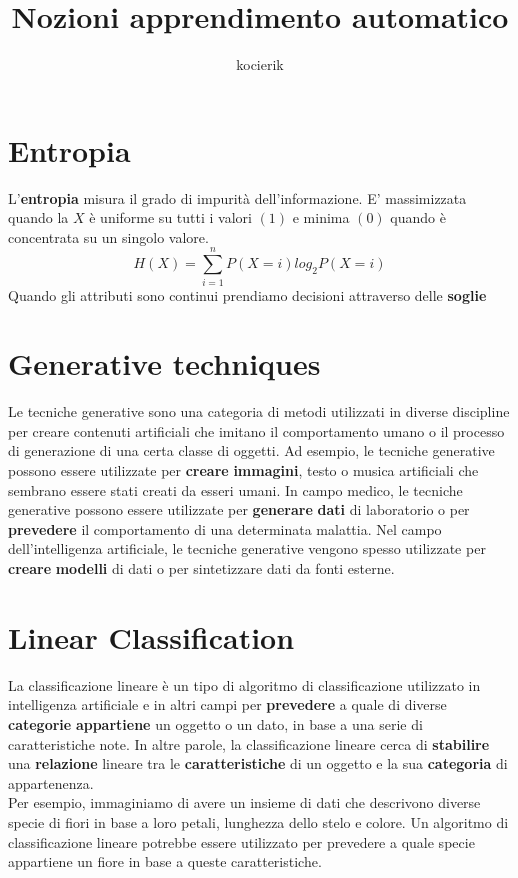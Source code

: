 \documentclass{article}
\title{Nozioni apprendimento automatico}
\author{kocierik}
\begin{document}
\maketitle
\tableofcontents

\section{Entropia}
L'\textbf{entropia} misura il grado di impurità dell'informazione. E' massimizzata quando la $X$ è uniforme su tutti i valori $(1)$ e minima $(0)$ quando è concentrata su un singolo valore.
$$H(X) = \sum_{i=1}^n P(X=i)log_2P(X=i)$$
Quando gli attributi sono continui prendiamo decisioni attraverso delle \textbf{soglie}

\section{Generative techniques}
Le tecniche generative sono una categoria di metodi utilizzati in diverse discipline per creare contenuti artificiali che imitano il comportamento umano o il processo di generazione di una certa classe di oggetti. Ad esempio, le tecniche generative possono essere utilizzate per \textbf{creare} \textbf{immagini}, testo o musica artificiali che sembrano essere stati creati da esseri umani. In campo medico, le tecniche generative possono essere utilizzate per \textbf{generare} \textbf{dati} di laboratorio o per \textbf{prevedere} il comportamento di una determinata malattia. Nel campo dell'intelligenza artificiale, le tecniche generative vengono spesso utilizzate per \textbf{creare} \textbf{modelli} di dati o per sintetizzare dati da fonti esterne.

\section{Linear Classification}
La classificazione lineare è un tipo di algoritmo di classificazione utilizzato in intelligenza artificiale e in altri campi per \textbf{prevedere} a quale di diverse \textbf{categorie} \textbf{appartiene} un oggetto o un dato, in base a una serie di caratteristiche note. In altre parole, la classificazione lineare cerca di \textbf{stabilire} una \textbf{relazione} lineare tra le \textbf{caratteristiche} di un oggetto e la sua \textbf{categoria} di appartenenza.\\

Per esempio, immaginiamo di avere un insieme di dati che descrivono diverse specie di fiori in base a loro petali, lunghezza dello stelo e colore. Un algoritmo di classificazione lineare potrebbe essere utilizzato per prevedere a quale specie appartiene un fiore in base a queste caratteristiche. \\
\end{document}
